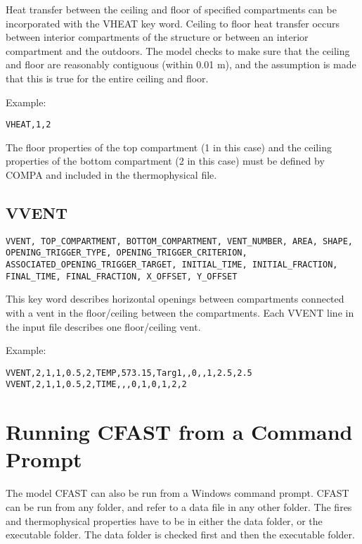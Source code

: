 Heat transfer between the ceiling and floor of specified compartments can be incorporated with the VHEAT key word. Ceiling to floor heat transfer occurs between interior compartments of the structure or between an interior compartment and the outdoors. The model checks to make sure that the ceiling and floor are reasonably contiguous (within 0.01 m), and the assumption is made that this is true for the entire ceiling and floor.

Example:

\begin{lstlisting}
VHEAT,1,2
\end{lstlisting}

The floor properties of the top compartment (1 in this case) and the ceiling properties of the bottom compartment (2 in this case) must be defined by COMPA and included in the thermophysical file.

\section{VVENT}

\begin{lstlisting}
VVENT, TOP_COMPARTMENT, BOTTOM_COMPARTMENT, VENT_NUMBER, AREA, SHAPE, OPENING_TRIGGER_TYPE, OPENING_TRIGGER_CRITERION, ASSOCIATED_OPENING_TRIGGER_TARGET, INITIAL_TIME, INITIAL_FRACTION, FINAL_TIME, FINAL_FRACTION, X_OFFSET, Y_OFFSET
\end{lstlisting}

This key word describes horizontal openings between compartments connected with a vent in the floor/ceiling between the compartments. Each VVENT line in the input file describes one floor/ceiling vent.

Example:

\begin{lstlisting}
VVENT,2,1,1,0.5,2,TEMP,573.15,Targ1,,0,,1,2.5,2.5
VVENT,2,1,1,0.5,2,TIME,,,0,1,0,1,2,2
\end{lstlisting}



\chapter{Running CFAST from a Command Prompt}

The model CFAST can also be run from a Windows command prompt.  CFAST can be run from any folder, and refer to a data file in any other folder. The fires and thermophysical properties have to be in either the data folder, or the executable folder. The data folder is checked first and then the executable folder.

